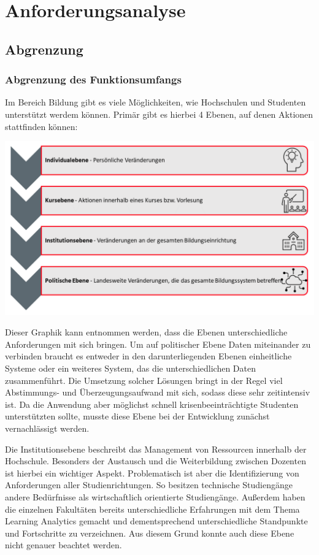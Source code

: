 \chapter{Anforderungsanalyse}
\section{Abgrenzung}
\subsection{Abgrenzung des Funktionsumfangs}\label{sub:abgrenzung}
Im Bereich Bildung gibt es viele Möglichkeiten, wie Hochschulen und Studenten unterstützt werdem können.
Primär gibt es hierbei 4 Ebenen, auf denen Aktionen stattfinden können:
\begin{center}
	\includegraphics[width=\linewidth, keepaspectratio]{img/4LA.png}
\end{center}
Dieser Graphik kann entnommen werden, dass die Ebenen unterschiedliche Anforderungen mit sich bringen. Um auf politischer Ebene Daten miteinander zu verbinden braucht es entweder in den darunterliegenden Ebenen einheitliche Systeme oder ein weiteres System, das die unterschiedlichen Daten zusammenführt. Die Umsetzung solcher Lösungen bringt in der Regel viel Abstimmungs- und Überzeugungsaufwand mit sich, sodass diese sehr zeitintensiv ist. Da die Anwendung aber möglichst schnell krisenbeeinträchtigte Studenten unterstützten sollte, musste diese Ebene bei der Entwicklung zunächst vernachlässigt werden.

Die Institutionsebene beschreibt das Management von Ressourcen innerhalb der Hochschule. Besonders der Austausch und die Weiterbildung zwischen Dozenten ist hierbei ein wichtiger Aspekt. Problematisch ist aber die Identifizierung von Anforderungen aller Studienrichtungen. So besitzen technische Studiengänge andere Bedürfnisse als wirtschaftlich orientierte Studiengänge. Außerdem haben die einzelnen Fakultäten bereits unterschiedliche Erfahrungen mit dem Thema Learning Analytics gemacht und dementsprechend unterschiedliche Standpunkte und Fortschritte zu verzeichnen. Aus diesem Grund konnte auch diese Ebene nicht genauer beachtet werden.

